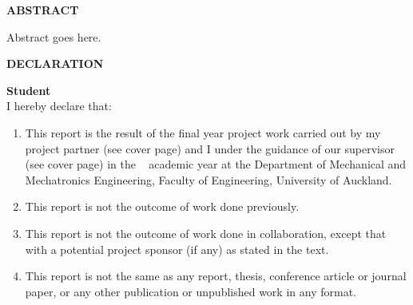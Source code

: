 \iftitlepage
    \clearpage{}
    \begin{flushleft}
    \reportNumber
    \par\end{flushleft}

    \vspace{1em}

    \begin{center}
    \textbf{\textsc{\large{}\projectTitle}}{\large\par}
    \par\end{center}

    \vspace{2em}

    \begin{center}
    \textbf{\large{}\name}{\large\par}
    \par\end{center}

    \vspace{2em}

    \ifabstract
        \begin{center}
        \textbf{\textsc{\large{}ABSTRACT}}{\large\par}
        \par\end{center}

Abstract goes here.
    
    \fi

    \newpage{}
\fi


\ifdeclarationpage
    \begin{center}
        \vspace{20cm}
        \textbf{DECLARATION}
    \end{center}

    {\textbf{Student}}\\ 

    I hereby declare that: 
    \begin{enumerate}
    \item This report is the result of the final year project work carried out by my project partner (see  cover  page)  and  I  under  the  guidance  of  our  supervisor  (see  cover  page)  in  the \the\year~ academic  year  at  the  Department  of  Mechanical and Mechatronics Engineering,  Faculty  of Engineering, University of Auckland.
    \item This report is not the outcome of work done previously.
    \item This  report  is  not  the  outcome  of  work  done  in  collaboration,  except  that  with  a potential project sponsor (if any) as stated in the text.
    \item This report is not the same as any report, thesis, conference article or journal paper, or any other publication or unpublished work in any format.
    \end{enumerate}

